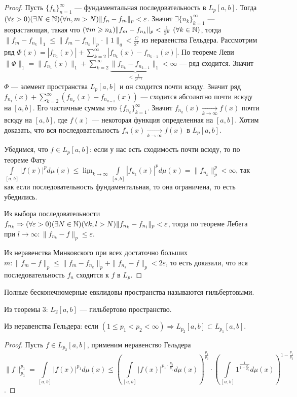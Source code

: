 \begin{proof}
	Пусть $\{f_n\}_{n=1}^\infty$ --- фундаментальная последовательность в $L_p[a,b]$. Тогда $(\forall\varepsilon >0)(\exists N\in \mathbb{N})(\forall n,m>N) \|f_n-f_m\|_p<\varepsilon$. Значит $\exists\{n_k\}_{k=1}^\infty$ --- возрастающая, такая что $(\forall m\geqslant n_k) \|f_m-f_{n_k}\|_p<\frac{1}{2^k}\ (\forall k\in \mathbb{N})$, тогда  $\|f_m-f_{n_k}\|_1\leqslant\|f_m-f_{n_k}\|_p\cdot\|1\|_q<\frac{C}{2^k}$ из неравенства Гельдера. Рассмотрим ряд $\Phi(x)=|f_{n_1}(x)|+\sum\limits_{k=2}^\infty |f_{n_k}(x)-f_{n_{k-1}}(x)|$. По теореме Леви $\|\Phi\|_1= \|f_{n_1}(x)\|_1+\sum\limits_{k=2}^\infty \underbrace{\|f_{n_k}-f_{n_{k-1}}\|_1}_{<\frac{1}{2^{k-1}}}<\infty$ --- ряд сходится. Значит $\Phi$ --- элемент пространства $L_p[a,b]$ и он сходится почти всюду. Значит ряд $f_{n_1}(x)+\sum\limits_{k=2}^\infty (f_{n_k}(x)-f_{n_{k-1}}(x))$ --- сходится абсолютно почти всюду на $[a,b]$. Его частичные суммы это $\{f_{n_k}\}_{k=1}^\infty$. Значит $f_{n_k}(x)\underset{k\to\infty}{\to}f(x)$ почти всюду на $[a,b]$, где $f(x)$ --- некоторая функция определенная на $[a,b]$. Хотим доказать, что вся последовательность $f_n(x)\underset{k\to\infty}{\to}f(x)$ в $L_p[a,b]$.
	
	Убедимся, что $f\in L_p[a,b]$: если у нас есть сходимость почти всюду, то по теореме Фату $\int\limits_{[a,b]}|f(x)|^pd\mu(x)\leqslant\underline{\lim}_{k\to\infty}\int\limits_{[a,b]}|f_{n_k}(x)|^pd\mu(x)=\|f_{n_k}\|^p_p<\infty$, так как если последовательность фундаментальная, то она ограничена, то есть убедились.
	
	Из выбора последовательности $f_{n_k}\Rightarrow(\forall\varepsilon>0)(\exists N\in\mathbb{N})(\forall k,l>N) \|f_{n_k}-f_{n_l}\|_p<\varepsilon$, тогда по теореме Лебега при $l\to\infty: \|f_{n_k}-f\|_p\leqslant\varepsilon$.
	
	Из неравенства Минковского при всех достаточно больших $m:\|f_m-f\|_p\leqslant \|f_m-f_{n_k}\|_p+\|f_{n_k}-f\|_p<2\varepsilon$, то есть доказали, что вся последовательность $f_n$ сходится к $f$ в $L_p$.
\end{proof}

\begin{Def}
	Полные бесконечномерные евклидовы пространства называются гильбертовыми.
\end{Def}

\begin{corollary}
	Из теоремы 3: $L_2[a,b]$ --- гильбертово пространство.
\end{corollary}

\begin{corollary}
	Из неравенства Гельдера: если $(1\leqslant p_1<p_2<\infty)\Rightarrow L_{p_2}[a,b]\subset L_{p_1}[a,b]$.
\end{corollary}
\begin{proof}
	Пусть $f\in L_{p_2}[a,b]$, применим неравенство Гельдера 
	$$\|f\|^{p_1}_{p_1}=\int\limits_{[a,b]} |f(x)|^{p_1}d\mu(x)\leqslant\left(\int\limits_{[a,b]}|f(x)|^{p_1\cdot\frac{p_2}{p_1}}d\mu(x)\right)^{\frac{p_1}{p_2}}\cdot\left(\int\limits_{[a,b]}1^{\frac{1}{1-\frac{p_1}{p_2}}}d\mu(x)\right)^{1-\frac{p_1}{p_2}}$$.
\end{proof}


